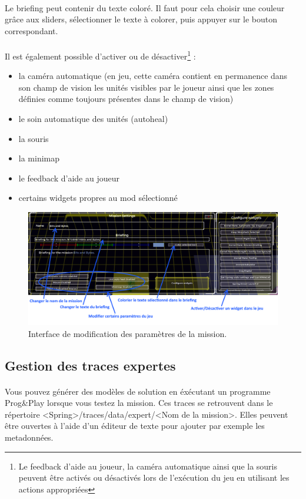 \documentclass[a4paper]{article}
\begin{document}
\paragraph{ }
Le briefing peut contenir du texte coloré. Il faut pour cela choisir une couleur grâce aux sliders, sélectionner le texte à colorer, puis appuyer sur le bouton correspondant.
\paragraph{ }
Il est également possible d'activer ou de désactiver\footnote{Le feedback d'aide au joueur, la caméra automatique ainsi que la souris peuvent être activés ou désactivés lors de l'exécution du jeu en utilisant les actions appropriées} :
\begin{itemize}
\item la caméra automatique (en jeu, cette caméra contient en permanence dans son champ de vision les unités visibles par le joueur ainsi que les zones définies comme toujours présentes dans le champ de vision)
\item le soin automatique des unités (autoheal)
\item la souris
\item la minimap
\item le feedback d'aide au joueur
\item certains widgets propres au mod sélectionné
\end{itemize}
\begin{figure}[H]
\centering
\includegraphics[width=\linewidth]{editor-mapsettings.png}
\caption{Interface de modification des paramètres de la mission.}
\label{fig:editor-mapsettings}
\end{figure}
\subsection{Gestion des traces expertes}
\paragraph{ }
Vous pouvez générer des modèles de solution en éxécutant un programme Prog\&Play lorsque vous testez la mission. Ces traces se retrouvent dans le répertoire <Spring>/traces/data/expert/<Nom de la mission>. Elles peuvent être ouvertes à l'aide d'un éditeur de texte pour ajouter par exemple les metadonnées.
\end{document}
